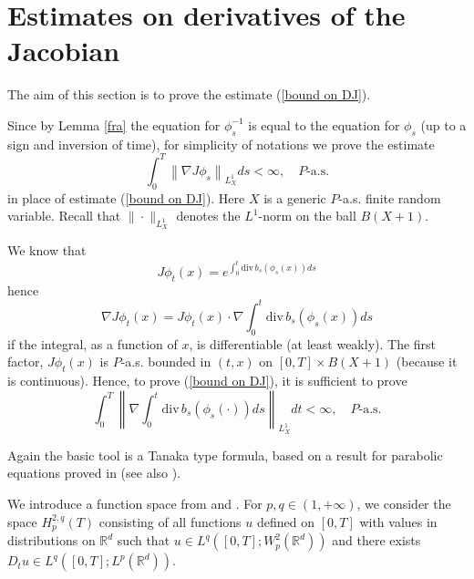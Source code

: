 \documentclass[a4paper,10pt]{article}
\begin{document}
\section{Estimates on derivatives of the Jacobian}

The aim of this section is to prove the estimate (\ref{bound on DJ}).


Since by Lemma \ref{fra} the equation for ${\phi}_{s}^{-1}$ is
equal to the equation for ${\phi }_{s}$ (up to a sign and
inversion of time), for simplicity of notations we prove the
estimate
\begin{equation}
\int_{0}^{T}\left\|  \nabla J{\phi}_{s}\right\|  _{L_{X}^{1}}ds<\infty,\quad
P\text{-a.s.} \label{bound on DJ direct}%
\end{equation}
in place of estimate (\ref{bound on DJ}). Here $X$ is a generic
$P$-a.s. finite random variable. Recall that
$
\| \cdot \|_{L_{X}^{1}}
$
denotes the $L^{1}$-norm  on the ball $B\left( X+1\right) $.


We know that
\[
J{\phi}_{t}\left(  x\right)  =e^{\int_{0}^{t}{\mathrm{div}\,
}b_{s}\left(  {\phi
}_{s}\left(  x\right)  \right)  ds}%
\]
hence%
\[
\nabla J{\phi}_{t}\left(  x\right)  =J{\phi}_{t}\left(  x\right)
\cdot \nabla\int_{0}^{t}{\mathrm{div}\, }b_{s}\left(
{\phi}_{s}\left(  x\right) \right)  ds
\]
if the integral, as a function of $x$, is differentiable (at least
weakly). The first factor, $J{\phi}_{t}\left(  x\right)  $ is
$P$-a.s. bounded in $\left(  t,x\right)  $ on $\left[  0,T\right]
\times B\left(  X +1 \right)  $  (because it is continuous).
Hence, to prove (\ref{bound on DJ}), it is
sufficient to prove%
\begin{equation}
\int_{0}^{T}\left\|  \nabla\int_{0}^{t}{\mathrm{div}\, }b_{s}\left(  {\phi}%
_{s}\left(  \cdot \right)  \right)  ds\right\|
_{L_{X}^{1}}dt<\infty,\quad
P\text{-a.s.} \label{estimate grad div b}%
\end{equation}

Again the basic tool is a Tanaka type formula, based on a result
for parabolic equations proved in \cite[Theorem 1.2]{Kr1} (see
also \cite[Theorem 10.3]{Kry-Ro}).



\vskip 2mm We introduce a  function space  from \cite{Kr1}
 and \cite{Kry-Ro}. For
$p, q \in (1, + \infty)$,
 we consider  the space $H^{2,q}_p(T)$ consisting of all
 functions
 $u$ defined on $[0,T]$ with values in distributions on $\mathbb{R} ^d$
 such that
 $u\in L^q ([0,T]; W^2_p(\mathbb{R} ^d))$ and there exists  $D_t u
  \in L^q ([0,T]; L^p(\mathbb{R} ^d))$.
\end{document}
